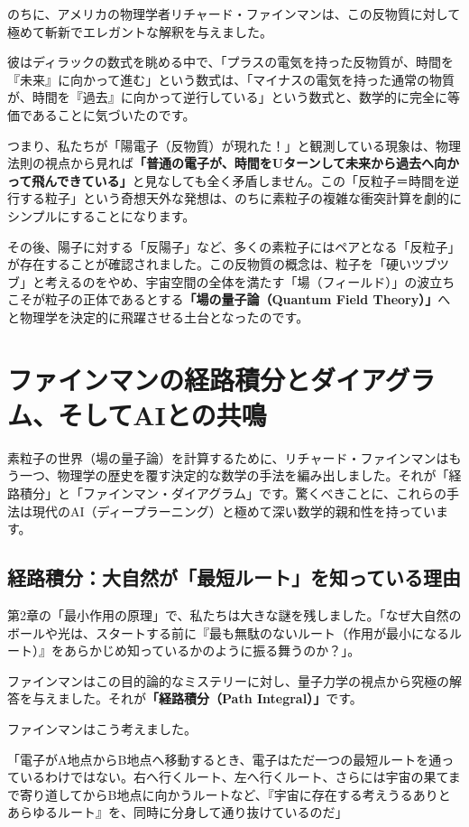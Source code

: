 のちに、アメリカの物理学者リチャード・ファインマンは、この反物質に対して極めて斬新でエレガントな解釈を与えました。

彼はディラックの数式を眺める中で、「プラスの電気を持った反物質が、時間を『未来』に向かって進む」という数式は、「マイナスの電気を持った通常の物質が、時間を『過去』に向かって逆行している」という数式と、数学的に完全に等価であることに気づいたのです。

つまり、私たちが「陽電子（反物質）が現れた！」と観測している現象は、物理法則の視点から見れば\textbf{「普通の電子が、時間をUターンして未来から過去へ向かって飛んできている」}と見なしても全く矛盾しません。この「反粒子＝時間を逆行する粒子」という奇想天外な発想は、のちに素粒子の複雑な衝突計算を劇的にシンプルにすることになります。

その後、陽子に対する「反陽子」など、多くの素粒子にはペアとなる「反粒子」が存在することが確認されました。この反物質の概念は、粒子を「硬いツブツブ」と考えるのをやめ、宇宙空間の全体を満たす「場（フィールド）」の波立ちこそが粒子の正体であるとする\textbf{「場の量子論（Quantum Field Theory）」}へと物理学を決定的に飛躍させる土台となったのです。

\section{ファインマンの経路積分とダイアグラム、そしてAIとの共鳴}

素粒子の世界（場の量子論）を計算するために、リチャード・ファインマンはもう一つ、物理学の歴史を覆す決定的な数学の手法を編み出しました。それが「経路積分」と「ファインマン・ダイアグラム」です。驚くべきことに、これらの手法は現代のAI（ディープラーニング）と極めて深い数学的親和性を持っています。

\subsection{経路積分：大自然が「最短ルート」を知っている理由}

第2章の「最小作用の原理」で、私たちは大きな謎を残しました。「なぜ大自然のボールや光は、スタートする前に『最も無駄のないルート（作用が最小になるルート）』をあらかじめ知っているかのように振る舞うのか？」。

ファインマンはこの目的論的なミステリーに対し、量子力学の視点から究極の解答を与えました。それが\textbf{「経路積分（Path Integral）」}です。

ファインマンはこう考えました。

「電子がA地点からB地点へ移動するとき、電子はただ一つの最短ルートを通っているわけではない。右へ行くルート、左へ行くルート、さらには宇宙の果てまで寄り道してからB地点に向かうルートなど、『宇宙に存在する考えうるありとあらゆるルート』を、同時に分身して通り抜けているのだ」

